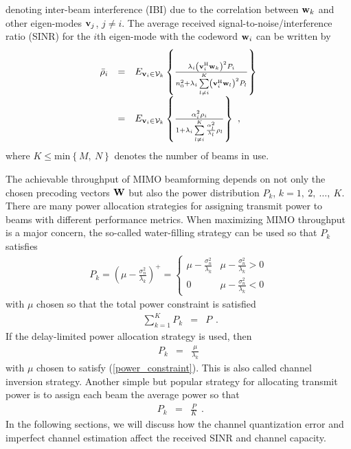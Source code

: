 \documentclass[10pt,fleqn, twocolumn]{IEEEtran}
\newcommand{\bv}{{\bf v}}
\newcommand{\bw}{{\bf w}}
\newcommand{\bW}{{\bf W}}
\begin{document}
\noindent denoting inter-beam interference (IBI) due to the
correlation between $\bw_{k}$ and other eigen-modes $\bv_{j}$,
$j\neq i$. The average received signal-to-noise/interference ratio
(SINR) for the $i$th eigen-mode with the codeword $\bw_{i}$ can be
written by
\begin{equation}
\begin{array}{rcl}
\bar\rho_{i}&=&\mbox{E}_{\bv_{i}\in{\cal
V}_{k}}\left\{\frac{\lambda_{i}\left(\bv_{i}^{\rm
H}\bw_{k}\right)^2P_{i}}{n_{0}^2+ \lambda_{i}\sum\limits_{l\neq
i}^{K}\left(\bv_{i}^{\rm H}\bw_{l}\right)^{2}P_{l}}\right\}\\
&=&\mbox{E}_{\bv_{i}\in{\cal
V}_{k}}\left\{\frac{\alpha_{i}^{2}\rho_{i}}{1+
\lambda_{i}\sum\limits_{l\neq
i}^{K}\frac{\alpha_{l}^{2}}{\lambda_{l}}\rho_{l}}\right\}\ ,
\end{array}
\end{equation}
\noindent where $K\leq\mbox{min}\left\{M,\ N\right\}$ denotes the
number of beams in use.

The achievable throughput of MIMO beamforming depends on not only
the chosen precoding vectors $\bW$ but also the power distribution
$P_{k}$, $k=1,\ 2,\ \ldots,\ K$. There are many power allocation
strategies for assigning transmit power to beams with different
performance metrics. When maximizing MIMO throughput is a major
concern, the so-called water-filling strategy can be used so that
$P_{k}$ satisfies
\begin{equation}
\begin{array}{l}
P_{k}=\left(\mu-\frac{\sigma_{n}^2}{\lambda_{k}}\right)^{+}=
\begin{cases}
\mu-\frac{\sigma_{n}^2}{\lambda_{k}} & \mu-\frac{\sigma_{n}^2}{\lambda_{k}} >0 \\
0 & \mu-\frac{\sigma_{n}^2}{\lambda_{k}} < 0
\end{cases}
\end{array}
\end{equation}
with $\mu$ chosen so that the total power constraint is satisfied
\begin{equation}
\begin{array}{rcl}
\sum\limits_{k=1}^{K}P_{k}&=&P
\end{array}.\label{power_constraint}
\end{equation}
\noindent If the delay-limited power allocation strategy is used,
then
\begin{equation}
\begin{array}{rcl}
P_{k}&=&\frac{\mu}{\lambda_{k}}
\end{array}
\end{equation}
with $\mu$ chosen to satisfy (\ref{power_constraint}). This is
also called channel inversion strategy. Another simple but popular
strategy for allocating transmit power is to assign each beam the
average power so that
\begin{equation}
\begin{array}{rcl}
P_{k}&=&\frac{P}{K}
\end{array}.\label{P_aver}
\end{equation}
\noindent In the following sections, we will discuss how the
channel quantization error and imperfect channel estimation affect
the received SINR and channel capacity.
\end{document}
